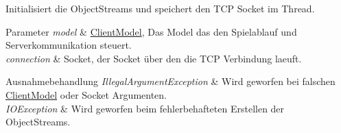Initialisiert die Object\-Streams und speichert den T\-C\-P Socket im Thread. 


\begin{DoxyParams}{Parameter}
{\em model} & \hyperlink{a00003}{Client\-Model}, Das Model das den Spielablauf und Serverkommunikation steuert. \\
\hline
{\em connection} & Socket, der Socket über den die T\-C\-P Verbindung laeuft. \\
\hline
\end{DoxyParams}

\begin{DoxyExceptions}{Ausnahmebehandlung}
{\em Illegal\-Argument\-Exception} & Wird geworfen bei falschen \hyperlink{a00003}{Client\-Model} oder Socket Argumenten. \\
\hline
{\em I\-O\-Exception} & Wird geworfen beim fehlerbehafteten Erstellen der Object\-Streams. \\
\hline
\end{DoxyExceptions}
